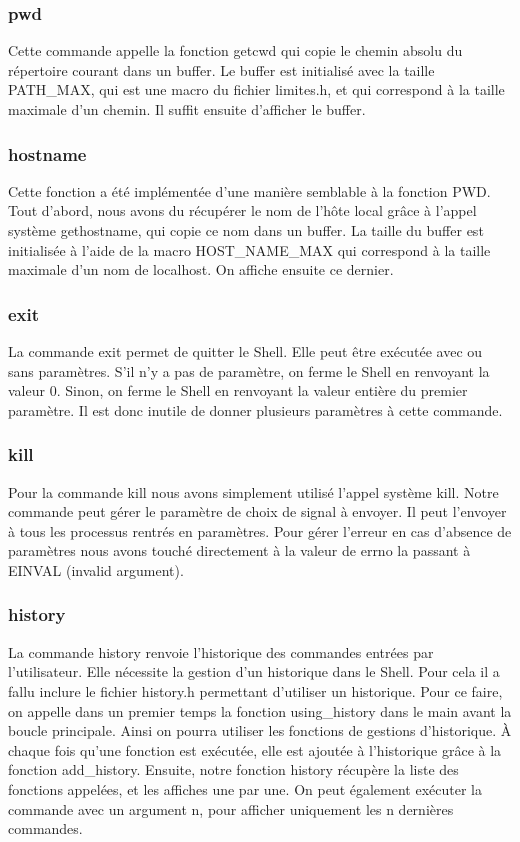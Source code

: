 \documentclass[12pt]{article}
\begin{document}
 \subsubsection{pwd}
 Cette commande appelle la fonction getcwd qui copie le chemin absolu du répertoire 
 courant dans un buffer.
 Le buffer est initialisé avec la taille PATH\_MAX, qui est une macro du fichier limites.h,
 et qui correspond à la taille maximale d'un chemin. Il suffit ensuite d'afficher le buffer.
 
 \subsubsection{hostname}
 Cette fonction a été implémentée d'une manière semblable à la fonction PWD.
Tout d'abord, nous avons du récupérer le nom de l'hôte local grâce à l'appel système gethostname, qui copie ce nom dans un buffer. 
La taille du buffer est initialisée à l'aide de la macro HOST\_NAME\_MAX qui correspond à la taille maximale d'un nom de localhost. 
On affiche ensuite ce dernier.
 
 \subsubsection{exit}
 La commande exit permet de quitter le Shell. 
 Elle peut être exécutée avec ou sans paramètres. 
 S'il n'y a pas de paramètre, on ferme le Shell en renvoyant la valeur 0. 
 Sinon, on ferme le Shell en renvoyant la valeur entière du premier paramètre. Il est donc inutile de donner plusieurs paramètres à cette commande.
 
 \subsubsection{kill}
 Pour la commande kill nous avons simplement utilisé l'appel système kill. 
 Notre commande peut gérer le paramètre de choix de signal à envoyer. Il peut l'envoyer à tous les processus
 rentrés en paramètres.
 Pour gérer l'erreur en cas d'absence de paramètres nous avons touché directement à la valeur
 de errno la passant à EINVAL (invalid argument).
 
 \subsubsection{history}
 La commande history renvoie l'historique des commandes entrées par l'utilisateur. 
 Elle nécessite la gestion d'un historique dans le Shell. 
 Pour cela il a fallu inclure le fichier history.h permettant d'utiliser un historique. 
 Pour ce faire, on appelle dans un premier temps la fonction using\_history dans le main avant la boucle principale.
 Ainsi on pourra utiliser les fonctions de gestions d'historique. 
 À chaque fois qu'une fonction est exécutée, elle est ajoutée à l'historique grâce à la fonction add\_history. 
 Ensuite, notre fonction history récupère la liste des fonctions appelées, et les affiches une par une. 
 On peut également exécuter la commande avec un argument n, pour afficher uniquement les n dernières commandes.
 
\end{document}
